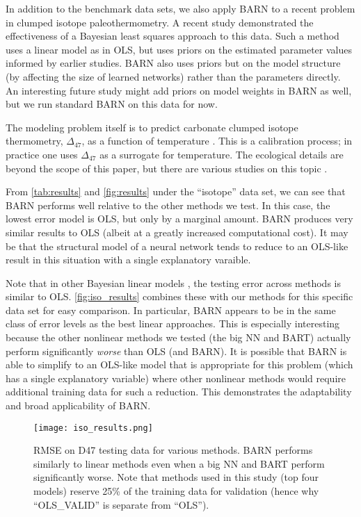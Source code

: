 \documentclass[12pt]{article}
\begin{document}
In addition to the benchmark data sets, we also apply BARN to a recent problem in clumped isotope paleothermometry.  A recent study \cite{roman2022bayclump} demonstrated the effectiveness of a Bayesian least squares approach to this data.  Such a method uses a linear model as in OLS, but uses priors on the estimated parameter values informed by earlier studies.  BARN also uses priors but on the model structure (by affecting the size of learned networks) rather than the parameters directly.  An interesting future study might add priors on model weights in BARN as well, but we run standard BARN on this data for now.

The modeling problem itself is to predict carbonate clumped isotope thermometry, $\Delta_{47}$, as a function of temperature \cite{eiler200418o13c16o}.  This is a calibration process; in practice one uses $\Delta_{47}$ as a surrogate for temperature.  The ecological details are beyond the scope of this paper, but there are various studies on this topic \cite{eiler200418o13c16o,roman2022bayclump,petersen2019effects}.

From \autoref{tab:results} and \autoref{fig:results} under the ``isotope'' data set, we can see that BARN performs well relative to the other methods we test.  In this case, the lowest error model is OLS, but only by a marginal amount.  BARN produces very similar results to OLS (albeit at a greatly increased computational cost).  It may be that the structural model of a neural network tends to reduce to an OLS-like result in this situation with a single explanatory varaible.

Note that in other Bayesian linear models \cite{roman2022bayclump}, the testing error across methods is similar to OLS.  \autoref{fig:iso_results} combines these with our methods for this specific data set for easy comparison.  In particular, BARN appears to be in the same class of error levels as the best linear approaches.  This is especially interesting because the other nonlinear methods we tested (the big NN and BART) actually perform significantly \emph{worse} than OLS (and BARN).  It is possible that BARN is able to simplify to an OLS-like model that is appropriate for this problem (which has a single explanatory variable) where other nonlinear methods would require additional training data for such a reduction.  This demonstrates the adaptability and broad applicability of BARN.

\begin{figure}[ht]
\centering
    \texttt{[image: iso\_results.png]}
    \caption{RMSE on D47 testing data for various methods.  BARN performs similarly to linear methods \cite{roman2022bayclump} even when a big NN and BART perform significantly worse.  Note that methods used in this study (top four models) reserve 25\% of the training data for validation (hence why ``OLS\_VALID'' is separate from ``OLS'').}
    \label{fig:iso_results}
\end{figure}
\end{document}
